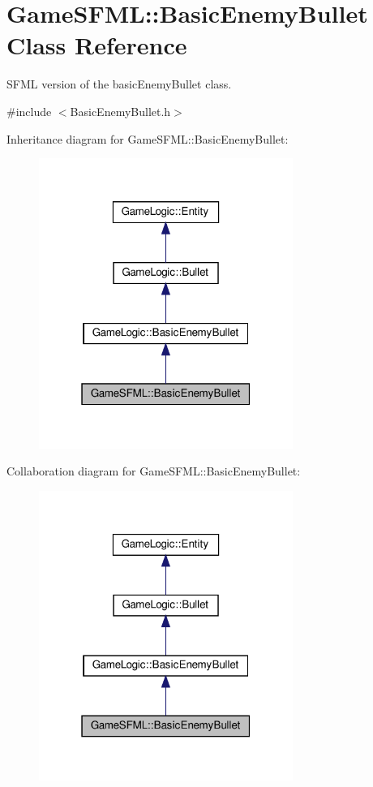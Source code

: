 \hypertarget{classGameSFML_1_1BasicEnemyBullet}{}\section{Game\+S\+F\+ML\+:\+:Basic\+Enemy\+Bullet Class Reference}
\label{classGameSFML_1_1BasicEnemyBullet}


S\+F\+ML version of the basic\+Enemy\+Bullet class.  




{\ttfamily \#include $<$Basic\+Enemy\+Bullet.\+h$>$}



Inheritance diagram for Game\+S\+F\+ML\+:\+:Basic\+Enemy\+Bullet\+:\nopagebreak
\begin{figure}[H]
\begin{center}
\leavevmode
\includegraphics[width=235pt]{classGameSFML_1_1BasicEnemyBullet__inherit__graph}
\end{center}
\end{figure}


Collaboration diagram for Game\+S\+F\+ML\+:\+:Basic\+Enemy\+Bullet\+:\nopagebreak
\begin{figure}[H]
\begin{center}
\leavevmode
\includegraphics[width=235pt]{classGameSFML_1_1BasicEnemyBullet__coll__graph}
\end{center}
\end{figure}
